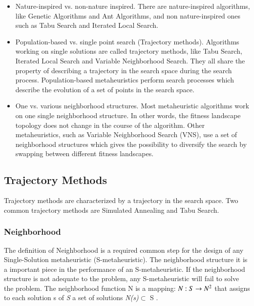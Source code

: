\documentclass[espaco=umemeio,chapter=TITLE,twoside,openright]{abnt}
\begin{document}
\begin{itemize}
\item Nature-inspired vs. non-nature inspired. There are nature-inspired algorithms, like Genetic Algorithms and Ant Algorithms, and non nature-inspired ones such as Tabu Search and Iterated Local Search.

\item Population-based vs. single point search (Trajectory methods). Algorithms working on single solutions are called trajectory methods, like Tabu Search, Iterated Local Search and Variable Neighborhood Search. They all share the property of describing a trajectory in the search space during the search process. Population-based metaheuristics perform search processes which describe the evolution of a set of points in the search space.

\item One vs. various neighborhood structures. Most metaheuristic algorithms work on one single neighborhood structure. In other words, the fitness landscape topology does not change in the course of the algorithm. Other metaheuristics, such as Variable Neighborhood Search (VNS), use a set of neighborhood structures which gives the possibility to diversify the search by swapping between different fitness
landscapes.


\end{itemize}

\subsection{Trajectory Methods}

Trajectory methods are characterized by a trajectory in the search space. Two common trajectory methods are Simulated Annealing and Tabu Search.

\subsubsection{Neighborhood}

The definition of Neighborhood is a required common step for the design of any Single-Solution metaheuristic (S-metaheuristic). The neighborhood structure it is a important piece in the performance of an S-metaheuristic. If the neighborhood structure is not adequate to the problem,
any S-metaheuristic will fail to solve the problem. The neighborhood function N is a mapping: $ N : S \rightarrow N\textsuperscript{2} $ that assigns to each solution s of \textit{S} a set of solutions \textit{N(s)}$\subset$ S \cite{Talbi2013}.
\end{document}
